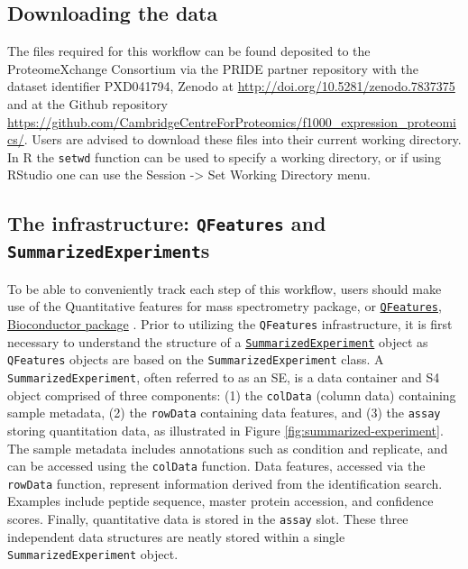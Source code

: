 \documentclass[9pt,a4paper,]{extarticle}
\begin{document}
\hypertarget{downloading-the-data}{%
\subsection{Downloading the data}\label{downloading-the-data}}

The files required for this workflow can be found deposited to the ProteomeXchange
Consortium via the PRIDE \citep{PerezRiverol2021, Deutsch2022} partner repository
with the dataset identifier PXD041794, Zenodo at \url{http://doi.org/10.5281/zenodo.7837375}
and at the Github repository \url{https://github.com/CambridgeCentreForProteomics/f1000_expression_proteomics/}.
Users are advised to download these files into their current working directory.
In R the \texttt{setwd} function can be used to specify a working directory, or if
using RStudio one can use the Session -\textgreater{} Set Working Directory menu.

\hypertarget{the-infrastructure-qfeatures-and-summarizedexperiments}{%
\subsection{\texorpdfstring{The infrastructure: \texttt{QFeatures} and \texttt{SummarizedExperiment}s}{The infrastructure: QFeatures and SummarizedExperiments}}\label{the-infrastructure-qfeatures-and-summarizedexperiments}}

To be able to conveniently track each step of this workflow, users should make
use of the Quantitative features for mass spectrometry package, or
\href{https://www.bioconductor.org/packages/release/bioc/html/QFeatures.html}{\texttt{QFeatures}, Bioconductor package}
\citep{QFeat}. Prior to utilizing the \texttt{QFeatures} infrastructure, it is first necessary to
understand the structure of a \href{https://bioconductor.org/packages/release/bioc/html/SummarizedExperiment.html}{\texttt{SummarizedExperiment}}
\citep{SumExp} object as \texttt{QFeatures} objects are based on the \texttt{SummarizedExperiment}
class. A \texttt{SummarizedExperiment}, often referred to as an SE, is a data container
and S4 object comprised of three components: (1) the \texttt{colData} (column data)
containing sample metadata, (2) the \texttt{rowData} containing data features, and (3)
the \texttt{assay} storing quantitation data, as illustrated in Figure
\ref{fig:summarized-experiment}. The sample metadata includes annotations such
as condition and replicate, and can be accessed using the \texttt{colData} function.
Data features, accessed via the \texttt{rowData} function, represent information
derived from the identification search. Examples include peptide sequence,
master protein accession, and confidence scores. Finally, quantitative data is
stored in the \texttt{assay} slot. These three independent data structures are neatly
stored within a single \texttt{SummarizedExperiment} object.
\end{document}
